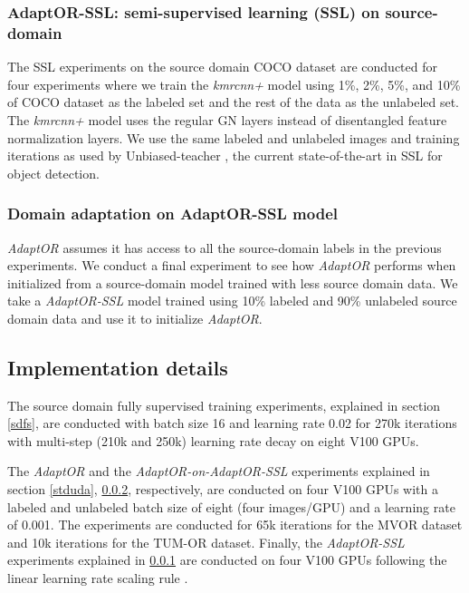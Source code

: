 \subsubsection{AdaptOR-SSL: semi-supervised learning (SSL) on source-domain} \label{sdssl}
The SSL experiments on the source domain COCO dataset are conducted for four experiments where we train the \emph{kmrcnn+} model using 1\%, 2\%, 5\%, and 10\% of COCO dataset as the labeled set and the rest of the data as the unlabeled set. The \emph{kmrcnn+} model uses the regular GN layers instead of disentangled feature normalization layers. We use the same labeled and unlabeled images and training iterations as used by Unbiased-teacher \citep{liu2021unbiased}, the current state-of-the-art in SSL for object detection. 

{\blue \subsubsection{Domain adaptation on AdaptOR-SSL model} \label{sdudaonssl}
\emph{AdaptOR} assumes it has access to all the source-domain labels in the previous experiments. We conduct a final experiment to see how  \emph{AdaptOR} performs when initialized from a source-domain model trained with less source domain data. We take a \emph{AdaptOR-SSL} model trained using 10\% labeled and 90\% unlabeled source domain data and use it to initialize \emph{AdaptOR}.}

\subsection{Implementation details}
The source domain fully supervised training experiments, explained in section \ref{sdfs}, are conducted with batch size 16 and learning rate 0.02 for 270k iterations with multi-step (210k and 250k) learning rate decay on eight V100 GPUs. 

The \emph{AdaptOR} and the \emph{AdaptOR-on-AdaptOR-SSL} experiments explained in section \ref{stduda}, \ref{sdudaonssl}, respectively, are conducted on four V100 GPUs with a labeled and unlabeled batch size of eight (four images/GPU) and a learning rate of 0.001. The experiments are conducted for 65k iterations for the MVOR dataset and 10k iterations for the TUM-OR dataset. Finally, the \emph{AdaptOR-SSL} experiments explained in \ref{sdssl} are conducted on four V100 GPUs following the linear learning rate scaling rule \citep{goyal2017accurate}.

